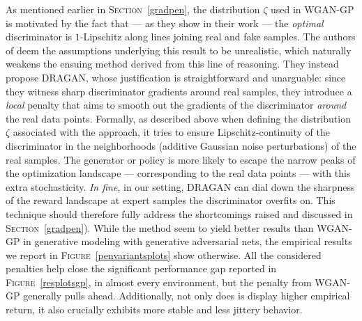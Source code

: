 As mentioned earlier in \textsc{Section}~\ref{gradpen},
the distribution $\zeta$ used in WGAN-GP \cite{Gulrajani2017-mr}
is motivated by the fact that --- as they show in their work ---
the \emph{optimal} discriminator is $1$-Lipschitz along lines joining
real and fake samples.
The authors of \cite{Kodali2017-xt} deem the assumptions underlying this result
to be unrealistic, which naturally weakens the ensuing method derived from this line
of reasoning.
They instead propose DRAGAN, whose justification is straightforward and unarguable:
since they witness sharp discriminator gradients around real samples,
they introduce a \emph{local} penalty that
aims to smooth out the gradients of the discriminator \emph{around} the real data points.
Formally, as described above when defining the distribution $\zeta$ associated with the approach,
it tries to ensure Lipschitz-continuity of the discriminator in the neighborhoods
(additive Gaussian noise perturbations)
of the real samples.
The generator or policy is more likely to escape the narrow peaks of the optimization
landscape --- corresponding to the real data points ---
with this extra stochasticity.
\textit{In fine}, in our setting, DRAGAN can dial down the sharpness of the reward landscape
at expert samples the discriminator overfits on.
This technique should therefore fully address the shortcomings
raised and discussed in \textsc{Section}~\ref{gradpen}).
While the method seem to yield better results than WGAN-GP
in generative modeling with generative adversarial nets,
the empirical results we report in \textsc{Figure}~\ref{penvariantsplots} show otherwise.
All the considered penalties help close the significant performance gap
reported in \textsc{Figure}~\ref{resplotsgp}, in almost every environment,
but the penalty from WGAN-GP generally pulls ahead.
Additionally, not only does is display higher empirical return,
it also crucially exhibits more stable and less jittery behavior.


